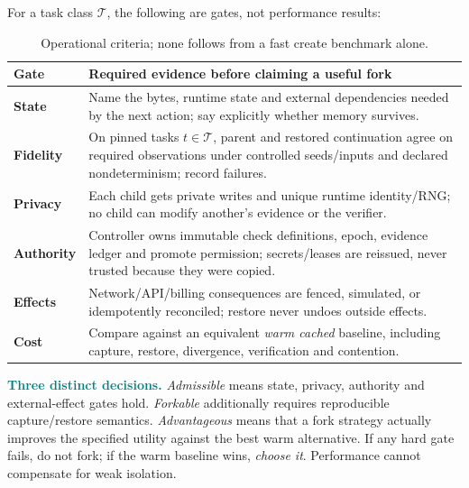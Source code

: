\documentclass[10pt,twocolumn]{article}
\newcommand{\Claim}[1]{\noindent\textcolor{teal}{\textbf{#1}}\;}
\newcommand{\1}{\mathbf{1}}
\begin{document}
For a task class $\mathcal T$, the following are gates, not performance results:
\begin{table}[h]
\centering\footnotesize
\begin{tabularx}{\columnwidth}{@{}>{\bfseries}p{}X@{}}
\toprule
Gate & Required evidence before claiming a useful fork\\
\midrule
State & Name the bytes, runtime state and external dependencies needed by the next action; say explicitly whether memory survives.\\
Fidelity & On pinned tasks $t\in\mathcal T$, parent and restored continuation agree on required observations under controlled seeds/inputs and declared nondeterminism; record failures.\\
Privacy & Each child gets private writes and unique runtime identity/RNG; no child can modify another's evidence or the verifier.\\
Authority & Controller owns immutable check definitions, epoch, evidence ledger and promote permission; secrets/leases are reissued, never trusted because they were copied.\\
Effects & Network/API/billing consequences are fenced, simulated, or idempotently reconciled; restore never undoes outside effects.\\
Cost & Compare against an equivalent \emph{warm cached} baseline, including capture, restore, divergence, verification and contention.\\
\bottomrule
\end{tabularx}
\caption{Operational criteria; none follows from a fast create benchmark alone.}
\end{table}

\Claim{Three distinct decisions.} \emph{Admissible} means state, privacy, authority and external-effect gates hold. \emph{Forkable} additionally requires reproducible capture/restore semantics. \emph{Advantageous} means that a fork strategy actually improves the specified utility against the best warm alternative. If any hard gate fails, do not fork; if the warm baseline wins, \emph{choose it}. Performance cannot compensate for weak isolation.
\end{document}
